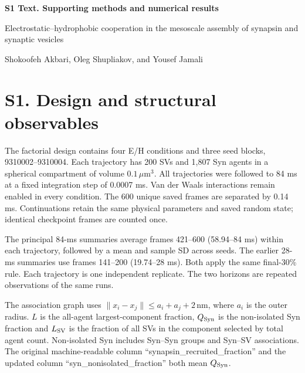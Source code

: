 \documentclass[11pt,letterpaper]{article}
\begin{document}
\begin{center}
{\Large\bfseries S1 Text. Supporting methods and numerical results}\par
\medskip
Electrostatic--hydrophobic cooperation in the mesoscale assembly of synapsin and synaptic vesicles\par
\medskip
Shokoofeh Akbari, Oleg Shupliakov, and Yousef Jamali
\end{center}
\section*{S1. Design and structural observables}
The factorial design contains four E/H conditions and three seed blocks,
9310002--9310004. Each trajectory has 200 SVs and 1,807 Syn agents in a
spherical compartment of volume $0.1\,\mu\mathrm m^3$. All trajectories
were followed to 84 ms at a fixed integration step of 0.0007 ms.
Van der Waals interactions remain enabled in every condition.
The 600 unique saved frames are separated by 0.14 ms. Continuations
retain the same physical parameters and saved random state; identical
checkpoint frames are counted once.

The principal 84-ms summaries average frames 421--600 (58.94--84 ms)
within each trajectory, followed by a mean and sample SD across seeds.
The earlier 28-ms summaries use frames 141--200 (19.74--28 ms).
Both apply the same final-30\% rule. Each trajectory is one independent
replicate. The two horizons are repeated observations of the same runs.

The association graph uses $\|x_i-x_j\|\leq a_i+a_j+2\,\mathrm{nm}$,
where $a_i$ is the outer radius. $L$ is the all-agent largest-component
fraction, $Q_{\rm Syn}$ is the non-isolated Syn fraction and $L_{\rm SV}$
is the fraction of all SVs in the component selected by total agent count.
Non-isolated Syn includes Syn--Syn groups and Syn--SV associations.
The original machine-readable column ``synapsin\_recruited\_fraction''
and the updated column ``syn\_nonisolated\_fraction'' both mean $Q_{\rm Syn}$.
\end{document}
